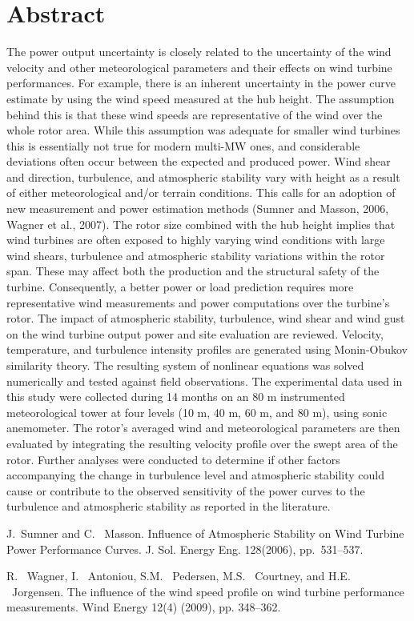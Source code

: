 \section*{Abstract}
The power output uncertainty is closely related to the uncertainty of the wind velocity and other meteorological parameters and their effects on wind turbine performances. For example, there is an inherent uncertainty in the power curve estimate by using the wind speed measured at the hub height. The assumption behind this is that these wind speeds are representative of the wind over the whole rotor area.  While this assumption was adequate for smaller wind turbines this is essentially not true for modern multi-MW ones, and considerable deviations often occur between the expected and produced power. Wind shear and direction, turbulence, and atmospheric stability vary with height as a result of either meteorological and/or terrain conditions. This calls for an adoption of new measurement and power estimation methods (Sumner and Masson, 2006, Wagner et al., 2007). The rotor size combined with the hub height implies that wind turbines are often exposed to highly varying wind conditions with large wind shears, turbulence and atmospheric stability variations within the rotor span. These may affect both the production and the structural safety of the turbine. Consequently, a better power or load prediction requires more representative wind measurements and power computations over the turbine's rotor. The impact of atmospheric stability, turbulence, wind shear and wind gust on the wind turbine output power and site evaluation are reviewed. Velocity, temperature, and turbulence intensity profiles are generated using Monin-Obukov similarity theory. The resulting system of nonlinear equations was solved numerically and tested against field observations. The experimental data used in this study were collected during 14 months on an 80 m instrumented meteorological tower at four levels (10 m, 40 m, 60 m, and 80 m), using sonic anemometer. The rotor's averaged wind and meteorological parameters are then evaluated by integrating the resulting velocity profile over the swept area of the rotor. Further analyses were conducted to determine if other factors accompanying the change in turbulence level and atmospheric stability could cause or contribute to the observed sensitivity of the power curves to the turbulence and atmospheric stability as reported in the literature.


\begin{thebibliography}{10}
{\sc J.~Sumner and C. ~Masson}. {Influence of Atmospheric Stability on Wind Turbine Power Performance Curves}. J. Sol. Energy Eng. 128(2006), pp.~531--537.

{\sc R. ~Wagner, I. ~Antoniou, S.M. ~Pedersen, M.S. ~Courtney, and H.E. ~Jorgensen}. The influence of the wind speed profile on wind turbine performance measurements. Wind Energy 12(4) (2009), pp. 348--362.
\end{thebibliography}